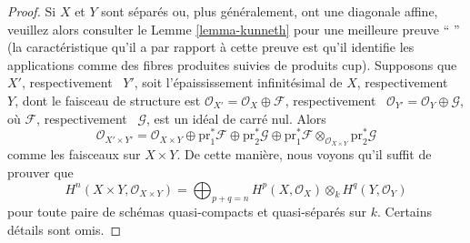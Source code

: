 \begin{proof}
Si $X$ et $Y$ sont séparés ou, plus généralement, ont une
diagonale affine, veuillez alors consulter le Lemme
\ref{lemma-kunneth} pour une meilleure preuve `` '' (la
caractéristique qu'il a par rapport à cette preuve est qu'il identifie
les applications comme des fibres produites suivies de produits cup).
Supposons que $X'$, respectivement \ $Y'$, soit l'épaississement
infinitésimal de $X$, respectivement \ $Y$, dont le faisceau de
structure est $\mathcal{O}_{X'} = \mathcal{O}_X \oplus \mathcal{F}$,
respectivement \ $\mathcal{O}_{Y'} = \mathcal{O}_Y \oplus \mathcal{G}$, où
$\mathcal{F}$, respectivement \ $\mathcal{G}$, est un idéal de carré nul. Alors
$$
\mathcal{O}_{X' \times Y'} =
\mathcal{O}_{X \times Y}
\oplus \text{pr}_1^*\mathcal{F}
\oplus \text{pr}_2^*\mathcal{G}
\oplus \text{pr}_1^*\mathcal{F}
\otimes_{\mathcal{O}_{X \times Y}} \text{pr}_2^*\mathcal{G}
$$
comme les faisceaux sur $X \times Y$. De cette
manière, nous voyons qu'il suffit de prouver que
$$
H^n(X \times Y, \mathcal{O}_{X \times Y}) =
\bigoplus\nolimits_{p + q = n}
H^p(X, \mathcal{O}_X) \otimes_k H^q(Y, \mathcal{O}_Y)
$$
pour toute paire de schémas quasi-compacts et
quasi-séparés sur $k$. Certains détails sont omis.


\end{proof}
